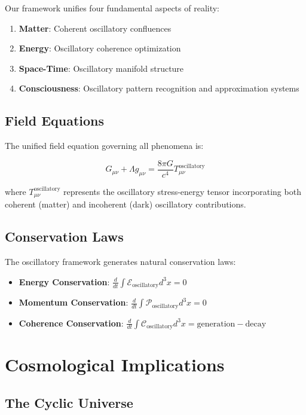 \documentclass[11pt]{article}
\theoremstyle{remark}
\begin{document}
Our framework unifies four fundamental aspects of reality:

\begin{enumerate}
\item \textbf{Matter}: Coherent oscillatory confluences
\item \textbf{Energy}: Oscillatory coherence optimization
\item \textbf{Space-Time}: Oscillatory manifold structure
\item \textbf{Consciousness}: Oscillatory pattern recognition and approximation systems
\end{enumerate}

\subsection{Field Equations}

The unified field equation governing all phenomena is:

$$G_{\mu\nu} + \Lambda g_{\mu\nu} = \frac{8\pi G}{c^4} T_{\mu\nu}^{\text{oscillatory}}$$

where $T_{\mu\nu}^{\text{oscillatory}}$ represents the oscillatory stress-energy tensor incorporating both coherent (matter) and incoherent (dark) oscillatory contributions.

\subsection{Conservation Laws}

The oscillatory framework generates natural conservation laws:

\begin{itemize}
\item \textbf{Energy Conservation}: $\frac{d}{dt}\int \mathcal{E}_{\text{oscillatory}} d^3x = 0$
\item \textbf{Momentum Conservation}: $\frac{d}{dt}\int \mathcal{P}_{\text{oscillatory}} d^3x = 0$
\item \textbf{Coherence Conservation}: $\frac{d}{dt}\int \mathcal{C}_{\text{oscillatory}} d^3x = \text{generation} - \text{decay}$
\end{itemize}

\section{Cosmological Implications}

\subsection{The Cyclic Universe}
\end{document}
